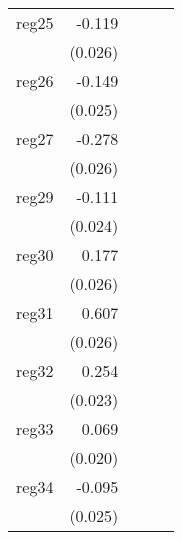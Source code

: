 {\begin{longtable}{l*{4}{D{.}{.}{-1}}}
\addlinespace
reg25       &      -0.119\sym{***}&                     &                     &                     \\
            &     (0.026)         &                     &                     &                     \\
\addlinespace
reg26       &      -0.149\sym{***}&                     &                     &                     \\
            &     (0.025)         &                     &                     &                     \\
\addlinespace
reg27       &      -0.278\sym{***}&                     &                     &                     \\
            &     (0.026)         &                     &                     &                     \\
\addlinespace
reg29       &      -0.111\sym{***}&                     &                     &                     \\
            &     (0.024)         &                     &                     &                     \\
\addlinespace
reg30       &       0.177\sym{***}&                     &                     &                     \\
            &     (0.026)         &                     &                     &                     \\
\addlinespace
reg31       &       0.607\sym{***}&                     &                     &                     \\
            &     (0.026)         &                     &                     &                     \\
\addlinespace
reg32       &       0.254\sym{***}&                     &                     &                     \\
            &     (0.023)         &                     &                     &                     \\
\addlinespace
reg33       &       0.069\sym{***}&                     &                     &                     \\
            &     (0.020)         &                     &                     &                     \\
\addlinespace
reg34       &      -0.095\sym{***}&                     &                     &                     \\
            &     (0.025)         &                     &                     &                     \\

\end{longtable}}
